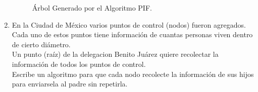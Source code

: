 \documentclass[12pt,a4paper]{report}
\begin{document}
\begin{enumerate}
{\begin{figure}[h!]
\begin{center}
					\caption{Árbol Generado por el Algoritmo PIF.}
				\end{center}
			\end{figure}
			\newpage
		}

		\item {
			En la Ciudad de México varios puntos de control (nodos) fueron agregados.\\
			Cada uno de estos puntos tiene información de cuantas personas viven
			dentro de cierto diámetro. \\
			Un punto (raíz) de la delegacion Benito Juárez quiere recolectar la
			información de todos los puntos de control. \\
			Escribe un algoritmo para que cada nodo recolecte la información de sus
			hijos para enviarsela al padre sin repetirla.\\

}
\end{enumerate}
\end{document}
